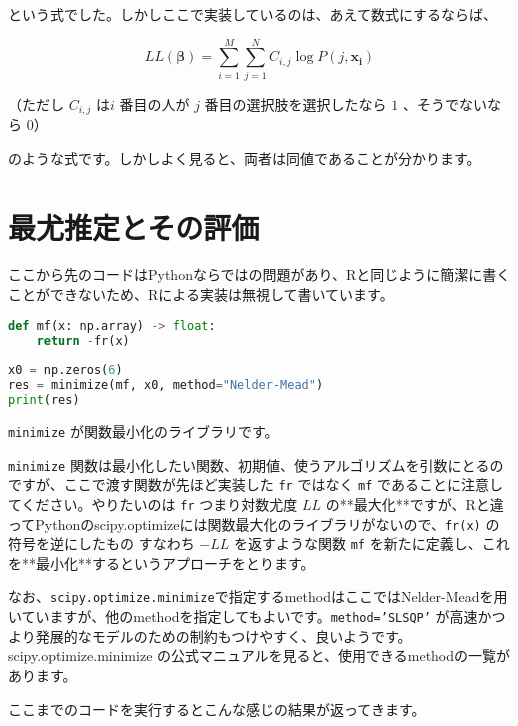     という式でした。しかしここで実装しているのは、あえて数式にするならば、

    \begin{equation}
        LL(\boldsymbol\beta) = \sum_{i=1}^M \sum_{j=1}^N C_{i,j}\log P(j, \boldsymbol{x_i}
        )
    \end{equation}

    （ただし $C_{i,j}$ は$i$ 番目の人が $j$ 番目の選択肢を選択したなら $1$ 、そうでないなら $0$）

    のような式です。しかしよく見ると、両者は同値であることが分かります。

    \section{最尤推定とその評価}

    ここから先のコードはPythonならではの問題があり、Rと同じように簡潔に書くことができないため、Rによる実装は無視して書いています。

    \begin{lstlisting}[language=Python]
def mf(x: np.array) -> float:
    return -fr(x)
    
x0 = np.zeros(6)
res = minimize(mf, x0, method="Nelder-Mead")
print(res)
\end{lstlisting}

    \lstinline{minimize} が関数最小化のライブラリです。

    \lstinline{minimize} 関数は最小化したい関数、初期値、使うアルゴリズムを引数にとるのですが、ここで渡す関数が先ほど実装した \lstinline{fr} ではなく \lstinline{mf} であることに注意してください。やりたいのは \lstinline{fr} つまり対数尤度 $LL$ の**最大化**ですが、Rと違ってPythonのscipy.optimizeには関数最大化のライブラリがないので、\lstinline{fr(x)} の符号を逆にしたもの すなわち $-LL$ を返すような関数 \lstinline{mf} を新たに定義し、これを**最小化**するというアプローチをとります。

    なお、\lstinline{scipy.optimize.minimize}で指定するmethodはここではNelder-Meadを用いていますが、他のmethodを指定してもよいです。\lstinline{method=’SLSQP’} が高速かつより発展的なモデルのための制約もつけやすく、良いようです。scipy.optimize.minimize の公式マニュアルを見ると、使用できるmethodの一覧があります。

    ここまでのコードを実行するとこんな感じの結果が返ってきます。

